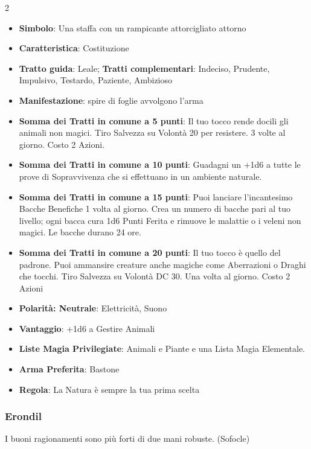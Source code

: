 \begin{multicols}{2}
\begin{itemize}[leftmargin=*] \setlength{\itemsep}{0pt}
\item \textbf{Simbolo}: Una staffa con un rampicante attorcigliato attorno
\item \textbf{Caratteristica}: Costituzione
\item \textbf{Tratto guida}: Leale; \textbf{Tratti complementari}: Indeciso, Prudente, Impulsivo, Testardo, Paziente, Ambizioso
\item \textbf{Manifestazione}: spire di foglie avvolgono l'arma
\item \textbf{Somma dei Tratti in comune a 5 punti}: Il tuo tocco rende docili gli animali non magici. Tiro Salvezza su Volontà 20 per resistere. 3 volte al giorno. Costo 2 Azioni.
\item \textbf{Somma dei Tratti in comune a 10 punti}: Guadagni un +1d6 a tutte le prove di Sopravvivenza che si effettuano in un ambiente naturale.
\item \textbf{Somma dei Tratti in comune a 15 punti}: Puoi lanciare l'incantesimo Bacche Benefiche 1 volta al giorno. Crea un numero di bacche pari al tuo livello; ogni bacca cura 1d6 Punti Ferita e rimuove le malattie o i veleni non magici. Le bacche durano 24 ore.
\item \textbf{Somma dei Tratti in comune a 20 punti}: Il tuo tocco è quello del padrone. Puoi ammansire creature anche magiche come Aberrazioni o Draghi che tocchi. Tiro Salvezza su Volontà DC 30. Una volta al giorno. Costo 2 Azioni
\item \textbf{Polarità: Neutrale}: Elettricità, Suono
\item \textbf{Vantaggio}: +1d6 a Gestire Animali
\item \textbf{Liste Magia Privilegiate}: Animali e Piante e una Lista Magia Elementale.
\item \textbf{Arma Preferita}: Bastone
\item \textbf{Regola}: La Natura è sempre la tua prima scelta
\end{itemize}

\subsubsection{Erondil}\label{erondil}\hypertarget{erondil}{}

\begin{enfasi}{
I buoni ragionamenti sono più forti di due mani robuste. (Sofocle)
}\end{enfasi}


\end{multicols}

